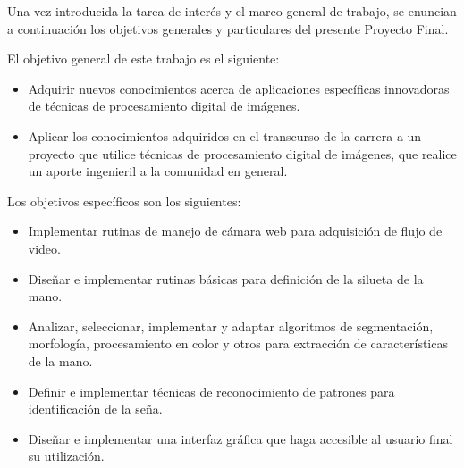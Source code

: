 Una vez introducida la tarea de interés y el marco general de trabajo, se
enuncian a continuación los objetivos generales y particulares del presente
Proyecto Final.

El objetivo general de este trabajo es el siguiente:

\begin{itemize}
\item Adquirir nuevos conocimientos acerca de aplicaciones específicas innovadoras
de técnicas de procesamiento digital de imágenes.

\item Aplicar los conocimientos adquiridos en el transcurso de la carrera a
un proyecto que utilice técnicas de procesamiento digital de imágenes,
que realice un aporte ingenieril a la comunidad en general.
\end{itemize}

Los objetivos específicos son los siguientes:
\begin{itemize}
	\item Implementar rutinas de manejo de cámara web para adquisición de flujo de video.
	\item Diseñar e implementar rutinas básicas para definición de la silueta de la mano.
	\item Analizar, seleccionar, implementar y adaptar algoritmos de segmentación, morfología, procesamiento en color y otros para extracción de características de la mano.
	\item Definir e implementar técnicas de reconocimiento de patrones para identificación de la seña.
	\item Diseñar e implementar una interfaz gráfica que haga accesible al usuario final su utilización.
\end{itemize}


